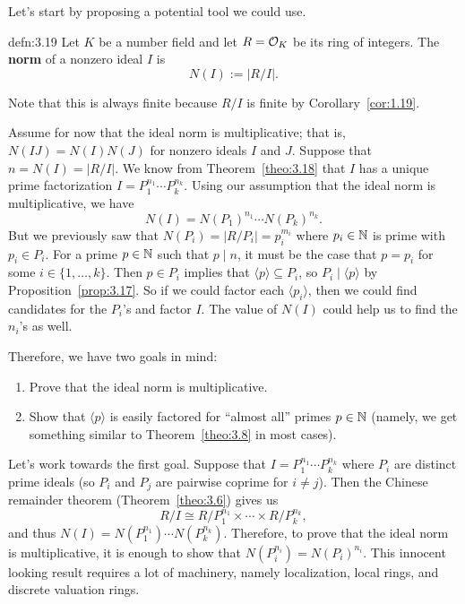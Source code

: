 Let's start by proposing a potential tool we could use. 

\begin{defn}{defn:3.19}
    Let $K$ be a number field and let $R = {\cal O}_K$ be its ring of integers. 
    The {\bf norm} of a nonzero ideal $I$ is 
    \[ N(I) := |R/I|. \] 
\end{defn}\vspace{-0.25cm}
Note that this is always finite because $R/I$ is finite by Corollary~\ref{cor:1.19}.

Assume for now that the ideal norm is multiplicative; that is, 
$N(IJ) = N(I)N(J)$ for nonzero ideals $I$ and $J$. Suppose that 
$n = N(I) = |R/I|$. We know from Theorem~\ref{theo:3.18} that $I$ has a 
unique prime factorization $I = P_1^{n_1} \cdots P_k^{n_k}$. Using our
assumption that the ideal norm is multiplicative, we have 
\[ N(I) = N(P_1)^{n_1} \cdots N(P_k)^{n_k}. \] 
But we previously saw that $N(P_i) = |R/P_i| = p_i^{m_i}$ where 
$p_i \in \mathbb{N}$ is prime with $p_i \in P_i$. For a prime $p \in \mathbb{N}$ 
such that $p \mid n$, it must be the case that $p = p_i$ for some $i \in 
\{1, \dots, k\}$. Then $p \in P_i$ implies that $\langle p \rangle 
\subseteq P_i$, so $P_i \mid \langle p \rangle$ by Proposition~\ref{prop:3.17}.
So if we could factor each $\langle p_i \rangle$, then we could find 
candidates for the $P_i$'s and factor $I$. The value of $N(I)$ could 
help us to find the $n_i$'s as well. 

Therefore, we have two goals in mind: 
\begin{enumerate}[(1)]
    \item Prove that the ideal norm is multiplicative.
    \item Show that $\langle p \rangle$ is easily factored for ``almost all''
    primes $p \in \mathbb{N}$ (namely, we get something similar to 
    Theorem~\ref{theo:3.8} in most cases).
\end{enumerate}
Let's work towards the first goal. Suppose that $I = P_1^{n_1} \cdots P_k^{n_k}$
where $P_i$ are distinct prime ideals (so $P_i$ and $P_j$ are pairwise coprime
for $i \neq j$). Then the Chinese remainder theorem (Theorem~\ref{theo:3.6})
gives us 
\[ R/I \cong R/P_1^{n_1} \times \cdots \times R/P_k^{n_k}, \] 
and thus $N(I) = N(P_1^{n_1}) \cdots N(P_k^{n_k})$. Therefore, to 
prove that the ideal norm is multiplicative, it is enough to show that 
$N(P_i^{n_i}) = N(P_i)^{n_i}$. This innocent looking result requires a 
lot of machinery, namely localization, local rings, and discrete valuation rings.
